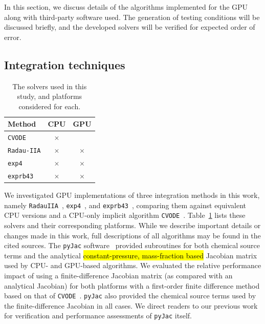 \documentclass[preprint,review,11pt]{elsarticle}
\DeclareRobustCommand{\hlg}[1]{\sethlcolor{green}\hl{#1}}
\DeclareRobustCommand{\hlg}[1]{\empty{#1}}
\begin{document}
In this section, we discuss details of the algorithms implemented for the GPU along with third-party software used.
The generation of testing conditions will be discussed briefly, and the developed solvers will be verified for expected order of error.

\subsection{Integration techniques}

\begin{table}[htb]
\centering
\begin{tabular}{@{}l c c@{}}
\toprule
Method & CPU & GPU \\
\midrule
\texttt{CVODE} & $\times$ & \\
\texttt{Radau-IIA} & $\times$ & $\times$ \\
\texttt{exp4} & $\times$ & $\times$ \\
\texttt{exprb43} & $\times$ & $\times$ \\
\bottomrule
\end{tabular}
\caption{The solvers used in this study, and platforms considered for each.}
\label{T:solvers}
\end{table}

We investigated GPU implementations of three integration methods in this work, namely \texttt{Radau\-IIA}~\cite{wanner1991solving}, \texttt{exp4}~\cite{Hochbruck:1998}, and \texttt{exprb43}~\cite{Hockbruck:2009}, comparing them against equivalent CPU versions and a CPU-only implicit algorithm \texttt{CVODE}~\cite{Hindmarsh:2005hg,cvode:2.8.2}.
Table~\ref{T:solvers} lists these solvers and their corresponding platforms.
While we describe important details or changes made in this work, full descriptions of all algorithms may be found in the cited sources.
The \texttt{pyJac} software~\cite{niemeyer_2016_51139,Niemeyer:2015ws,Niemeyer:2016aa} provided subroutines for both chemical source terms and the analytical \hlg{constant-pressure, mass-fraction based} Jacobian matrix used by CPU- and GPU-based algorithms.
We evaluated the relative performance impact of using a finite-difference Jacobian matrix (as compared with an analytical Jacobian) for both platforms with a first-order finite difference method based on that of \texttt{CVODE}~\cite{Hindmarsh:2005hg}.
\texttt{pyJac} also provided the chemical source terms used by the finite-difference Jacobian in all cases.
We direct readers to our previous work~\cite{Niemeyer:2015ws,Niemeyer:2016aa} for verification and performance assessments of \texttt{pyJac} itself.
\end{document}
